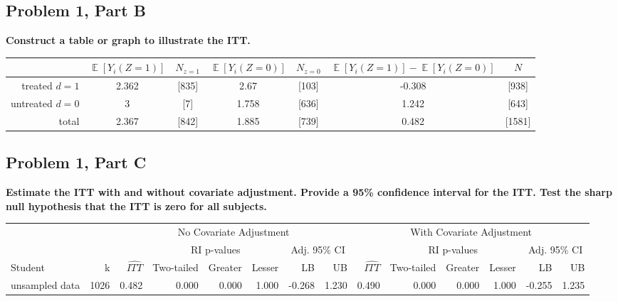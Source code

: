\documentclass[11pt,notitlepage]{article}
\def\E{\mathop{\mathbb{E}}}
\begin{document}
\clearpage

\subsection{Problem 1, Part B} {\bf Construct a table or graph to illustrate the ITT.}

\begin{table}[ht]
\begin{center}
\begin{tabular}{r|cc|cc|cc}
  \hline
 & $\E[Y_i(Z=1)]$ & $N_{z=1}$ & $\E[Y_i(Z=0)]$ & $N_{z=0}$ & $\E[Y_i(Z=1)] - \E[Y_i(Z=0)]$ & $N$ \\ 
  \hline
treated $d=1$ & 2.362 & [835] & 2.67 & [103] & -0.308 & [938] \\ 
  untreated $d=0$ & 3 & [7] & 1.758 & [636] & 1.242 & [643] \\ 
  \hline
  total & 2.367 & [842] & 1.885 & [739] & 0.482 & [1581] \\ 
   \hline
\end{tabular}
\end{center}
\end{table}

\subsection{Problem 1, Part C} {\bf Estimate the ITT with and without covariate adjustment. Provide a 95\% confidence interval for the ITT.  Test the sharp null hypothesis that the ITT is zero for all subjects.}

\vspace{1cm}
\begin{table}[h!]\footnotesize
\begin{center}
\begin{tabular}{lrrrrrrr|rrrrrr}
  \hline
  & & \multicolumn{6}{c|}{No Covariate Adjustment} & \multicolumn{6}{c}{With Covariate Adjustment} \\
  \cline{3-14}
  & & & \multicolumn{3}{c}{RI p-values} & \multicolumn{2}{c|}{Adj. 95\% CI} &  & \multicolumn{3}{c}{RI p-values} & \multicolumn{2}{c}{Adj. 95\% CI} \\
  \cline{4-6}\cline{10-12}
Student & k & $\widehat{ITT}$ & Two-tailed & Greater & Lesser & LB & UB & $\widehat{ITT}$ & Two-tailed & Greater & Lesser & LB & UB \\ 
  \hline
unsampled data & 1026 & 0.482 & 0.000 & 0.000 & 1.000 & -0.268 & 1.230 & 0.490 & 0.000 & 0.000 & 1.000 & -0.255 & 1.235 \\ 
   \hline
\end{tabular}
\end{center}
\end{table}
\end{document}
